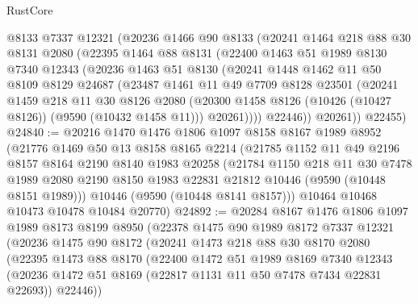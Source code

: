\begin{lexlean}{RustCore}
\begin{coremodule}
      @8133
      @7337
      @12321
      (@20236
        @1466
        @90
        @8133
        (@20241
          @1464
          @218
          @88
          @30
          @8131
          @2080
          (@22395
            @1464
            @88
            @8131
            (@22400
              @1463
              @51
              @1989
              @8130
              @7340
              @12343
              (@20236
                @1463
                @51
                @8130
                (@20241
                  @1448
                  @1462
                  @11
                  @50
                  @8109
                  @8129
                  @24687
                  (@23487
                    @1461
                    @11
                    @49
                    @7709
                    @8128
                    @23501
                    (@20241
                      @1459
                      @218
                      @11
                      @30
                      @8126
                      @2080
                      (@20300 @1458 @8126 (@10426 (@10427 @8126)) (@9590 (@10432 @1458 @11)))
                      @20261))))
              @22446))
          @20261))
      @22455)
@24840 := @20216
    @1470
    @1476
    @1806
    @1097
    @8158
    @8167
    @1989
    @8952
    (@21776
      @1469
      @50
      @13
      @8158
      @8165
      @2214
      (@21785
        @1152
        @11
        @49
        @2196
        @8157
        @8164
        @2190
        @8140
        @1983
        @20258
        (@21784
          @1150
          @218
          @11
          @30
          @7478
          @1989
          @2080
          @2190
          @8150
          @1983
          @22831
          @21812
          @10446
          (@9590 (@10448 @8151 @1989)))
        @10446
        (@9590 (@10448 @8141 @8157)))
      @10464
      @10468
      @10473
      @10478
      @10484
      @20770)
@24892 := @20284
    @8167
    @1476
    @1806
    @1097
    @1989
    @8173
    @8199
    @8950
    (@22378
      @1475
      @90
      @1989
      @8172
      @7337
      @12321
      (@20236
        @1475
        @90
        @8172
        (@20241
          @1473
          @218
          @88
          @30
          @8170
          @2080
          (@22395
            @1473
            @88
            @8170
            (@22400
              @1472
              @51
              @1989
              @8169
              @7340
              @12343
              (@20236 @1472 @51 @8169 (@22817 @1131 @11 @50 @7478 @7434 @22831 @22693))
              @22446))

\end{coremodule}
\end{lexlean}
